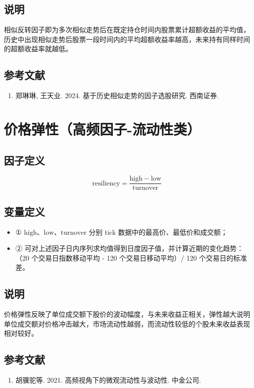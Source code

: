 \documentclass{article}
\begin{document}
\subsection{说明}
相似反转因子即为多次相似走势后在既定持仓时间内股票累计超额收益的平均值，历史中出现相似走势后股票一段时间内的平均超额收益率越高，未来持有同样时间的超额收益率就越低。

\subsection{参考文献}
\begin{enumerate}
    \item 郑琳琳, 王天业. 2024. 基于历史相似走势的因子选股研究. 西南证券.
\end{enumerate}

\section{价格弹性（高频因子-流动性类）}

\subsection{因子定义}
\begin{equation}
    \mathrm{resiliency} = \frac{\mathrm{high} - \mathrm{low}}{\mathrm{turnover}}
\end{equation}

\subsection{变量定义}
\begin{itemize}
    \item ① \(\mathrm{high}\)、\(\mathrm{low}\)、\(\mathrm{turnover}\) 分别 tick 数据中的最高价、最低价和成交额；
    \item ② 可对上述因子日内序列求均值得到日度因子值，并计算近期的变化趋势：（20 个交易日指数移动平均 - 120 个交易日移动平均）/ 120 个交易日的标准差。
\end{itemize}

\subsection{说明}
价格弹性反映了单位成交额下股价的波动幅度，与未来收益正相关，弹性越大说明单位成交额对价格冲击越大，市场流动性越弱，而流动性较低的个股未来收益表现相对较好。

\subsection{参考文献}
\begin{enumerate}
    \item 胡骥驼等. 2021. 高频视角下的微观流动性与波动性. 中金公司.
\end{enumerate}
\end{document}
